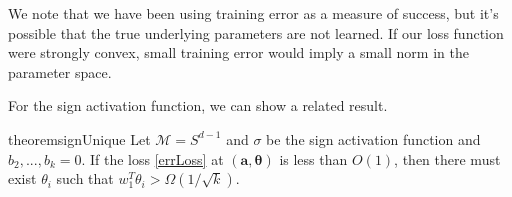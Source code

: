 We note that we have been using training error as a measure of
success, but it's possible that the true underlying parameters are not
learned. If our loss function were strongly convex, small training
error would imply a small norm in the parameter space. 

For the sign activation function, we can show a related result.

\begin{restatable}{theorem}{signUnique}
\label{SignUnique}
Let $\mathcal{M} = S^{d-1}$ and $\sigma$ be the sign activation function and $b_2,...,b_k = 0$. If the loss \eqref{errLoss} at $(\boldsymbol{a,\theta})$ is less than $O(1)$, then there must exist $\theta_i$ such that $w_1^T\theta_i > \Omega(1/\sqrt{k})$.
\end{restatable}


